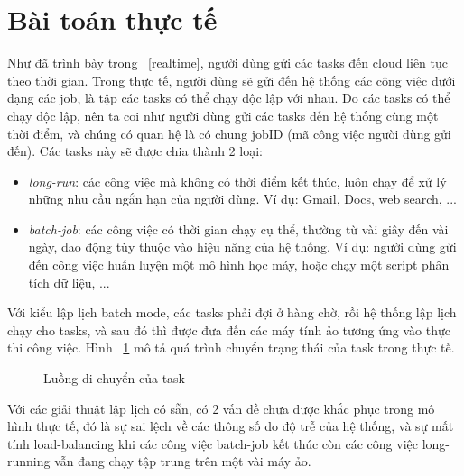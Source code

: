 \documentclass{my_style}
\begin{document}
\section{Bài toán thực tế}
Như đã trình bày trong ~\ref{realtime}, người dùng gửi các tasks đến cloud liên tục theo thời gian. Trong thực tế, người dùng sẽ gửi đến hệ thống các công việc dưới dạng các job, là tập các tasks có thể chạy độc lập với nhau. Do các tasks có thể chạy độc lập, nên ta coi như người dùng gửi các tasks đến hệ thống cùng một thời điểm, và chúng có quan hệ là có chung jobID (mã công việc người dùng gửi đến). Các tasks này sẽ được chia thành 2 loại\cite{17}: 
\begin{itemize}
	\item \textit{long-run}: các công việc mà không có thời điểm kết thúc, luôn chạy để xử lý những nhu cầu ngắn hạn của người dùng. Ví dụ: Gmail, Docs, web search, ...
	\item \textit{batch-job}: các công việc có thời gian chạy cụ thể, thường từ vài giây đến vài ngày, dao động tùy thuộc vào hiệu năng của hệ thống. Ví dụ: người dùng gửi đến công việc huấn luyện một mô hình học máy, hoặc chạy một script phân tích dữ liệu, ... 
\end{itemize}
Với kiểu lập lịch batch mode, các tasks phải đợi ở hàng chờ, rồi hệ thống lập lịch chạy cho tasks, và sau đó thì được đưa đến các máy tính ảo tương ứng vào thực thi công việc. Hình ~\ref{fig:flow} mô tả quá trình chuyển trạng thái của task trong thực tế.  
\begin{figure}[h!]
    \centering
    \qquad
    \caption{Luồng di chuyển của task}%
    \label{fig:flow}%
\end{figure}
Với các giải thuật lập lịch có sẵn, có 2 vấn đề chưa được khắc phục trong mô hình thực tế, đó là sự sai lệch về các thông số do độ trễ của hệ thống, và sự mất tính load-balancing khi các công việc batch-job kết thúc còn các công việc long-running vẫn đang chạy tập trung trên một vài máy ảo. 
\end{document}
